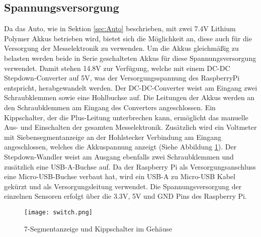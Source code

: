 \subsection{Spannungsversorgung}
\label{subsec:elekSupply}
Da das Auto, wie in Sektion \ref{sec:Auto} beschrieben, mit zwei 7.4\ac{V} Lithium Polymer Akkus betrieben wird, bietet sich die Möglichkeit an, diese auch für die Versorgung der Messelektronik zu verwenden. Um die Akkus gleichmäßig zu belasten werden beide in Serie geschalteten Akkus für diese Spannungsversorgung verwendet. Damit stehen 14.8\ac{V} zur Verfügung, welche mit einem DC-DC Stepdown-Converter auf 5\ac{V}, was der Versorgungsspannung des RaspberryPi entspricht, herabgewandelt werden. Der DC-DC-Converter weist am Eingang zwei Schraubklemmen sowie eine Hohlbuchse auf. Die Leitungen der Akkus werden an den Schraubklemmen am Eingang des Converters angeschlossen. Ein Kippschalter, der die Plus-Leitung unterbrechen kann, ermöglicht das manuelle Aus- und Einschalten der gesamten Messelektronik. Zusätzlich wird ein Voltmeter mit Siebensegmentanzeige an der Hohlstecker Verbindung am Eingang angeschlossen, welches die Akkuspannung anzeigt (Siehe Abbildung \ref{fig:switch}). Der Stepdown-Wandler weist am Ausgang ebenfalls zwei Schraubklemmen und zusätzlich eine \ac{USB}-A-Buchse auf. Da der Raspberry Pi als Versorgungsanschluss eine Micro-\ac{USB}-Buchse verbaut hat, wird ein USB-A zu Micro-\ac{USB} Kabel gekürzt und als Versorgungsleitung verwendet. Die Spannungsversorgung der einzelnen Sensoren erfolgt über die 3.3\ac{V}, 5\ac{V} und GND Pins des Raspberry Pi. 

\begin{figure}[h]
\centering
\texttt{[image: switch.png]}
\caption{7-Segmentanzeige und Kippschalter im Gehäuse}
\label{fig:switch}
\end{figure}

